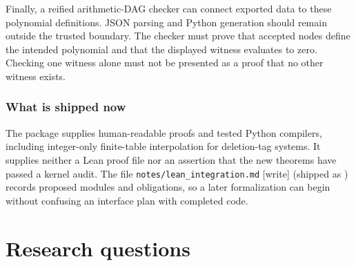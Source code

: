 \documentclass[11pt,a4paper]{article}
\theoremstyle{definition}
\theoremstyle{remark}
\newcommand{\wtag}{\textup{[write]}}%
\begin{document}
Finally, a reified arithmetic-DAG checker can connect exported data to these polynomial definitions. JSON parsing and Python generation should remain outside the trusted boundary. The checker must prove that accepted nodes define the intended polynomial and that the displayed witness evaluates to zero. Checking one witness alone must not be presented as a proof that no other witness exists.

\subsubsection{What is shipped now}
The package supplies human-readable proofs and tested Python compilers, including integer-only finite-table interpolation for deletion-tag systems. It supplies neither a Lean proof file nor an assertion that the new theorems have passed a kernel audit. The file \texttt{notes/lean\_integration.md} \wtag{} (shipped as ) records proposed modules and obligations, so a later formalization can begin without confusing an interface plan with completed code.


\section{Research questions}\label{cdc:sec:questions}
\label{cdc:ct:sec:questions}\label{cdc:mem:sec:questions}\label{cdc:sec:research}\label{cdc:cs:sec:questions}\label{cdc:qc:sec:questions}
\end{document}
